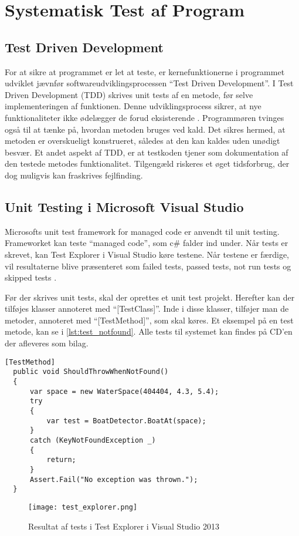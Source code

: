 \section{Systematisk Test af Program}
\label{sec:systematisk_test_af_program}

\subsection{Test Driven Development}
\label{sub:test_driven_development}

For at sikre at programmet er let at teste, er kernefunktionerne i programmet udviklet jævnfør softwareudviklingsprocessen \enquote{Test Driven Development}. I Test Driven Development (TDD) skrives unit tests af en metode, før selve implementeringen af funktionen. Denne udviklingsprocess sikrer, at nye funktionaliteter ikke ødelægger de forud eksisterende \cite{martin2006agile}. Programmøren tvinges også til at tænke på, hvordan metoden bruges ved kald. Det sikres hermed, at metoden er overskueligt konstrueret, således at den kan kaldes uden unødigt besvær. Et andet aspekt af TDD, er at testkoden tjener som dokumentation af den testede metodes funktionalitet. Tilgengæld riskeres et øget tidsforbrug, der dog muligvis kan fraskrives fejlfinding.

\subsection{Unit Testing i Microsoft Visual Studio}
\label{sub:unit_testing_i_microsoft_visual_studio}

Microsofts unit test framework for managed code er anvendt til unit testing. Frameworket kan teste \enquote{managed code}, som c\# falder ind under. Når tests er skrevet, kan Test Explorer i Visual Studio køre testene. Når testene er færdige, vil resultaterne blive præsenteret som failed tests, passed tests, not run tests og skipped tests \cite{msdn_unittest}.

Før der skrives unit tests, skal der oprettes et unit test projekt. Herefter kan der tilføjes klasser annoteret med \enquote{[TestClass]}. Inde i disse klasser, tilføjer man de metoder, annoteret med \enquote{[TestMethod]}, som skal køres. Et eksempel på en test metode, kan se i \cref{lst:test_notfound}.
Alle tests til systemet kan findes på CD'en der afleveres som bilag.

\begin{lstlisting}[label=lst:test_notfound, caption={Eksempel på testfunktion}]
  [TestMethod]
  public void ShouldThrowWhenNotFound()
  {
      var space = new WaterSpace(404404, 4.3, 5.4);
      try
      {
          var test = BoatDetector.BoatAt(space);
      }
      catch (KeyNotFoundException _)
      {
          return;
      }
      Assert.Fail("No exception was thrown.");
  }
\end{lstlisting}



\begin{figure}
  \centering
  \texttt{[image: test\_explorer.png]}
  \caption{Resultat af tests i Test Explorer i Visual Studio 2013}
  \label{fig:test_explorer}
\end{figure}

